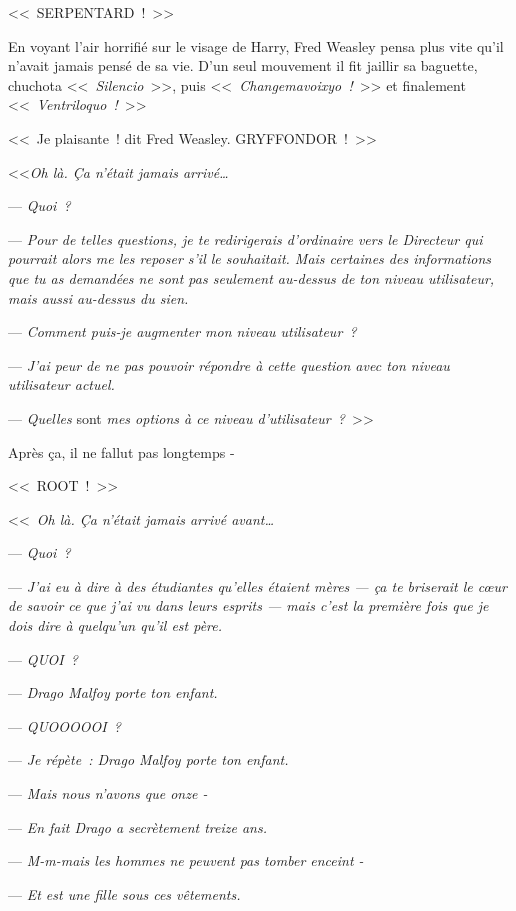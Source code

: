{\later

<<~SERPENTARD~!~>>

En voyant l'air horrifié sur le visage de Harry, Fred Weasley pensa plus vite qu'il n'avait jamais pensé de sa vie. D'un seul mouvement il fit jaillir sa baguette, chuchota <<~\emph{Silencio}~>>, puis <<~\emph{Changemavoixyo~!}~>> et finalement <<~\emph{Ventriloquo~!}~>>

<<~Je plaisante~! dit Fred Weasley. GRYFFONDOR~!~>>

\later

<<\emph{Oh là. Ça n'était jamais arrivé…}

--- \emph{Quoi~?}

--- \emph{Pour de telles questions, je te redirigerais d'ordinaire vers le Directeur qui pourrait alors me les reposer s'il le souhaitait. Mais certaines des informations que tu as demandées ne sont pas seulement au-dessus de ton niveau utilisateur, mais aussi au-dessus du sien.}

--- \emph{Comment puis-je augmenter mon niveau utilisateur~?}

--- \emph{J'ai peur de ne pas pouvoir répondre à cette question avec ton niveau utilisateur actuel.}

--- \emph{Quelles} sont \emph{mes options à ce niveau d'utilisateur~?}~>>

Après ça, il ne fallut pas longtemps -

<<~ROOT~!~>>

\later

<<~\emph{Oh là. Ça n'était jamais arrivé avant…}

--- \emph{Quoi~?}

--- \emph{J'ai eu à dire à des étudiantes qu'elles étaient mères — ça te briserait le cœur de savoir ce que j'ai vu dans leurs esprits — mais c'est la première fois que je dois dire à quelqu'un qu'il est père.}

--- \emph{QUOI~?}

--- \emph{Drago Malfoy porte ton enfant.}

--- \emph{QUOOOOOI~?}

--- \emph{Je répète~: Drago Malfoy porte ton enfant.}

--- \emph{Mais nous n'avons que onze -}

--- \emph{En fait Drago a secrètement treize ans.}

--- \emph{M-m-mais les hommes ne peuvent pas tomber enceint -}

--- \emph{Et est une fille sous ces vêtements.}

}
